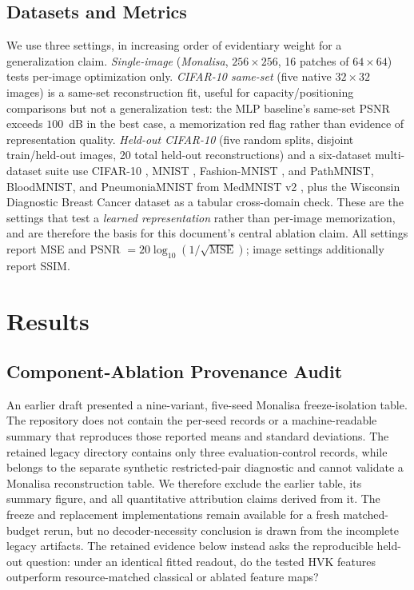 \documentclass[11pt]{article}
\begin{document}
\subsection{Datasets and Metrics}
We use three settings, in increasing order of evidentiary weight for a generalization claim. \textit{Single-image} (\textit{Monalisa}, $256\times256$, 16 patches of $64\times64$) tests per-image optimization only. \textit{CIFAR-10 same-set} (five native $32\times32$ images) is a same-set reconstruction fit, useful for capacity/positioning comparisons but not a generalization test: the MLP baseline's same-set PSNR exceeds $100$~dB in the best case, a memorization red flag rather than evidence of representation quality. \textit{Held-out CIFAR-10} (five random splits, disjoint train/held-out images, 20 total held-out reconstructions) and a six-dataset multi-dataset suite use CIFAR-10 \cite{Krizhevsky2009}, MNIST \cite{LeCun1998}, Fashion-MNIST \cite{Xiao2017}, and PathMNIST, BloodMNIST, and PneumoniaMNIST from MedMNIST v2 \cite{Yang2023}, plus the Wisconsin Diagnostic Breast Cancer dataset \cite{Wolberg1993} as a tabular cross-domain check. These are the settings that test a \emph{learned representation} rather than per-image memorization, and are therefore the basis for this document's central ablation claim. All settings report MSE and PSNR $=20\log_{10}(1/\sqrt{\mathrm{MSE}})$; image settings additionally report SSIM.

\section{Results}
\label{sec:results}

\subsection{Component-Ablation Provenance Audit}
\label{sec:component_provenance}
\begin{sloppypar}
An earlier draft presented a nine-variant, five-seed Monalisa freeze-isolation table. The repository does not contain the per-seed records or a machine-readable summary that reproduces those reported means and standard deviations. The retained legacy directory contains only three evaluation-control records, while  belongs to the separate synthetic restricted-pair diagnostic and cannot validate a Monalisa reconstruction table. We therefore exclude the earlier table, its summary figure, and all quantitative attribution claims derived from it. The freeze and replacement implementations remain available for a fresh matched-budget rerun, but no decoder-necessity conclusion is drawn from the incomplete legacy artifacts. The retained evidence below instead asks the reproducible held-out question: under an identical fitted readout, do the tested HVK features outperform resource-matched classical or ablated feature maps?
\end{sloppypar}
\end{document}
